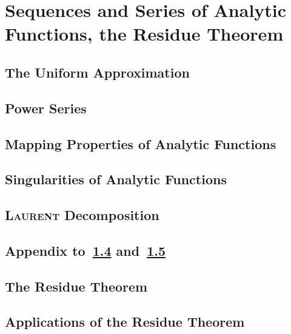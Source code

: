 \chapter{Sequences and Series of Analytic Functions, the Residue Theorem}

\section{The Uniform Approximation}

\section{Power Series}

\section{Mapping Properties of Analytic Functions}

\section{Singularities of Analytic Functions}\label{section:singularties-of-analytic-functions}

\section{\textsc{Laurent} Decomposition}\label{section:laurent-decomposition}

\begin{subappendices}

\section{Appendix to~\ref{section:singularties-of-analytic-functions} and~\ref{section:laurent-decomposition}}

\end{subappendices}

\section{The Residue Theorem}

\section{Applications of the Residue Theorem}
